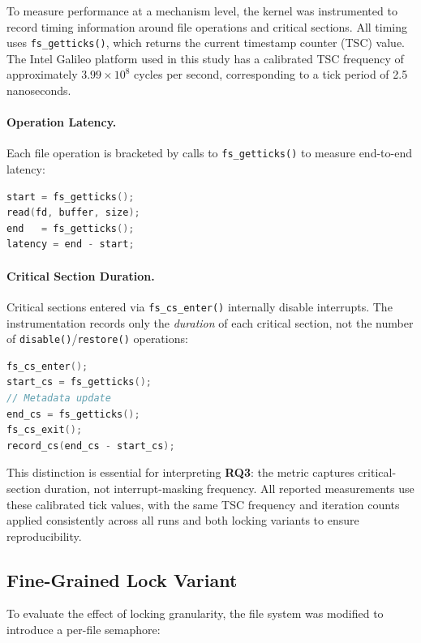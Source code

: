 \documentclass[sigconf]{acmart}
\begin{document}
To measure performance at a mechanism level, the kernel was instrumented to record timing information around file operations and critical sections. All timing uses \texttt{fs\_getticks()}, which returns the current timestamp counter (TSC) value. The Intel Galileo platform used in this study has a calibrated TSC frequency of approximately
\(3.99 \times 10^8\) cycles per second, corresponding to a tick period of 2.5 nanoseconds.

\paragraph{Operation Latency.}
Each file operation is bracketed by calls to \texttt{fs\_getticks()} to measure end-to-end latency:

\begin{lstlisting}[language=C]
start = fs_getticks();
read(fd, buffer, size);
end   = fs_getticks();
latency = end - start;
\end{lstlisting}

\paragraph{Critical Section Duration.}
Critical sections entered via \texttt{fs\_cs\_enter()} internally disable interrupts. The instrumentation records only the \emph{duration} of each critical section, not the number of \texttt{disable()}/\texttt{restore()} operations:

\begin{lstlisting}[language=C]
fs_cs_enter();
start_cs = fs_getticks();
// Metadata update
end_cs = fs_getticks();
fs_cs_exit();
record_cs(end_cs - start_cs);
\end{lstlisting}

This distinction is essential for interpreting \textbf{RQ3}: the metric captures critical-section duration, not interrupt-masking frequency. All reported measurements use these calibrated tick values, with the same TSC frequency and iteration counts applied consistently across all runs and both locking variants to ensure reproducibility.



\subsection{Fine-Grained Lock Variant}

To evaluate the effect of locking granularity, the file system was modified to introduce a per-file semaphore:
\end{document}

